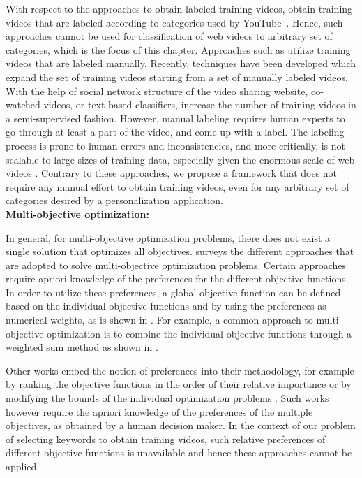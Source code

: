 With respect to the approaches to obtain labeled training videos, \cite{chen2010web,wu2010data,ramachandran2009videomule}   obtain training videos that are labeled according to categories used by YouTube~\cite{Youtube}. Hence, such approaches cannot be used for classification of web videos to arbitrary set of categories, which is the focus of this chapter. Approaches such as \cite{schindler2008internet,yang2007multi,song2010taxonomic}  utilize training videos that are labeled manually. Recently, techniques have been developed \cite{wang2010youtubecat,zhang2011improving} which expand the set of training videos starting from a set of manually labeled videos. With the help of social network structure of the video sharing website, co-watched videos, or text-based classifiers, \cite{wang2010youtubecat,zhang2011improving} increase the number of training videos in a semi-supervised fashion. However, manual labeling requires human experts to go through at least a part of the video, and come up with a label. The labeling process is prone to human errors and inconsistencies, and more critically, is not scalable to large sizes of training data, especially given the enormous scale of web videos \cite{Neilson2011}. Contrary to these approaches, we propose a framework that does not require any manual effort to obtain training videos, even for any arbitrary set of categories desired by a personalization application.\\

\noindent \textbf{Multi-objective optimization: } 

In general, for multi-objective optimization problems, there does not exist a single solution that optimizes all objectives. \cite{Marler04} surveys the different approaches that are adopted to solve multi-objective optimization problems. Certain approaches require apriori knowledge of the preferences for the different objective functions. In order to utilize these preferences, a global objective function can be defined based on the individual objective functions and by using the preferences as numerical weights, as is shown in \cite{Papalambros96,Bridgman22,Koski87}. For example, a common approach to multi-objective optimization is to combine the individual objective functions through a weighted sum method as shown in \cite{Steuer89}. 

Other works embed the notion of preferences into their methodology, for example by ranking the objective functions in the order of their relative importance \cite{YoonHwang95,Hertz94} or by modifying the bounds of the individual optimization problems \cite{HwangMasud79,Haimes71}. Such works however require the apriori knowledge of the preferences of the multiple objectives, as obtained by a human decision maker. 
In the context of our problem of selecting keywords to obtain training videos, such relative preferences of different objective functions is unavailable and hence these approaches cannot be applied. 

